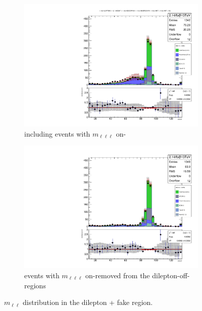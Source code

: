 \begin{figure}
\begin{center}
	\begin{subfigure}[t]{.7\textwidth}
		\includegraphics[width=\textwidth]{Background/bkg_fakeLight/Z_MOSSF}
		\caption{including events with $m_{\ell\ell\ell}$ on-\Z}
	\end{subfigure}
	\begin{subfigure}[t]{.7\textwidth}
		\includegraphics[width=\textwidth]{Background/bkg_fakeLight/Z_noAIC_MOSSF}
		\caption{events with $m_{\ell\ell\ell}$ on-\Z removed from the dilepton-off-\Z regions}
	\end{subfigure}
	\caption{$m_{\ell\ell}$ distribution in the dilepton + fake region.
	\label{fig:fakeLight_Z_MOSSF}}
\end{center}
\end{figure}

